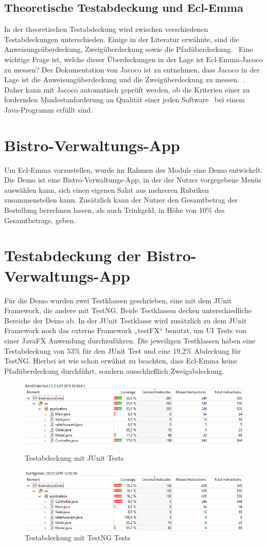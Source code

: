 \documentclass[a4paper]{article}
\begin{document}
\subsection{Theoretische Testabdeckung und Ecl-Emma}
In der theoretischen Testabdeckung wird zwischen verschiedenen Testabdeckungen unterschieden. Einige in der Literatur erwähnte, sind die Anweisungsüberdeckung, Zweigüberdeckung sowie die Pfadüberdeckung.~\cite{hoff}
Eine wichtige Frage ist, welche dieser Überdeckungen in der Lage ist Ecl-Emma-Jacoco zu messen? Der Dokumentation von Jacoco ist zu entnehmen, dass Jacoco in der Lage ist die Anweisungüberdeckung und die Zweigüberdeckung zu messen.~\cite{jacoco}. Daher kann mit Jacoco automatisch geprüft werden, ob die Kriterien einer zu fordernden Mindestanforderung an Qualität einer jeden Software~\cite{hoff} bei einem Java-Programm erfüllt sind.
\section{Bistro-Verwaltungs-App}
Um Ecl-Emma vorzustellen, wurde im Rahmen des Moduls eine Demo entwickelt. 
Die Demo ist eine Bistro-Verwaltungs-App, in der der Nutzer vorgegebene Menüs auswählen kann, sich einen eigenen Salat aus mehreren Rubriken zusammenstellen kann. Zusätzlich kann der Nutzer den Gesamtbetrag der Bestellung berechnen lassen, als auch Trinkgeld, in Höhe von 10\% des Gesamtbetrags, geben.
\section{Testabdeckung der Bistro-Verwaltungs-App}
Für die Demo wurden zwei Testklassen geschrieben, eine mit dem JUnit Framework, die andere mit TestNG. Beide Testklassen decken unterschiedliche Bereiche der Demo ab. 
In der JUnit Testklasse wird zusätzlich zu dem JUnit Framework noch das externe Framework „testFX“ benutzt, um UI Tests von einer JavaFX Anwendung durchzuführen.
Die jeweiligen Testklassen haben eine Testabdeckung von 53\% für den JUnit Test und eine 19,2\% Abdeckung für TestNG. 
Hierbei ist wie schon erwähnt zu beachten, dass Ecl-Emma keine Pfadüberdeckung durchführt, sondern ausschließlich Zweigabdeckung. 
\begin{figure}[h]
\includegraphics[scale=0.60 ]{Testabdeckung_JUnit.png}
\caption{Testabdeckung mit JUnit Tests}
\includegraphics[scale=0.60]{Testabdeckung_TestNG.png}
\caption{Testabdeckung mit TestNG Tests}
\centering
\end{figure}
\end{document}
